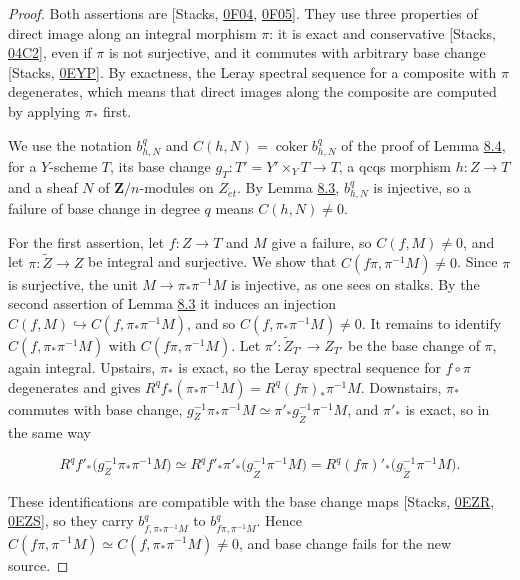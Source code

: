 \documentclass[11pt]{article}
\begin{document}
\begin{proof}[{Proof}]\label{bp660}%
Both assertions are [Stacks, \href{https://stacks.math.columbia.edu/tag/0F04}{0F04}, \href{https://stacks.math.columbia.edu/tag/0F05}{0F05}]. They use three properties of direct image along an integral morphism \(\pi\): it is exact and conservative [Stacks, \href{https://stacks.math.columbia.edu/tag/04C2}{04C2}], even if \(\pi\) is not surjective, and it commutes with arbitrary base change [Stacks, \href{https://stacks.math.columbia.edu/tag/0EYP}{0EYP}]. By exactness, the Leray spectral sequence for a composite with \(\pi\) degenerates, which means that direct images along the composite are computed by applying \(\pi_*\) first.

We use the notation \(b^q_{h,N}\) and \(C(h,N)=\operatorname{coker}b^q_{h,N}\) of the proof of Lemma \hyperref[bp656]{8.4}, for a \(Y\)-scheme \(T\), its base change \(g_T:T'=Y'\times_YT\to T\), a qcqs morphism \(h:Z\to T\) and a sheaf \(N\) of \(\mathbf Z/n\)-modules on \(Z_{\acute{e}t}\). By Lemma \hyperref[bp653]{8.3}, \(b^q_{h,N}\) is injective, so a failure of base change in degree \(q\) means \(C(h,N)\neq0\).

For the first assertion, let \(f:Z\to T\) and \(M\) give a failure, so \(C(f,M)\neq0\), and let \(\pi:\widetilde Z\to Z\) be integral and surjective. We show that \(C(f\pi,\pi^{-1}M)\neq0\). Since \(\pi\) is surjective, the unit \(M\to\pi_*\pi^{-1}M\) is injective, as one sees on stalks. By the second assertion of Lemma \hyperref[bp653]{8.3} it induces an injection \(C(f,M)\hookrightarrow C(f,\pi_*\pi^{-1}M)\), and so \(C(f,\pi_*\pi^{-1}M)\neq0\). It remains to identify \(C(f,\pi_*\pi^{-1}M)\) with \(C(f\pi,\pi^{-1}M)\). Let \(\pi':\widetilde Z_{T'}\to Z_{T'}\) be the base change of \(\pi\), again integral. Upstairs, \(\pi_*\) is exact, so the Leray spectral sequence for \(f\circ\pi\) degenerates and gives \(R^qf_*(\pi_*\pi^{-1}M)=R^q(f\pi)_*\pi^{-1}M\). Downstairs, \(\pi_*\) commutes with base change, \(g_Z^{-1}\pi_*\pi^{-1}M\simeq\pi'_*g_{\widetilde Z}^{-1}\pi^{-1}M\), and \(\pi'_*\) is exact, so in the same way

\[
R^qf'_*\bigl(g_Z^{-1}\pi_*\pi^{-1}M\bigr)
\simeq R^qf'_*\pi'_*\bigl(g_{\widetilde Z}^{-1}\pi^{-1}M\bigr)
=R^q(f\pi)'_*\bigl(g_{\widetilde Z}^{-1}\pi^{-1}M\bigr).
\]

These identifications are compatible with the base change maps [Stacks, \href{https://stacks.math.columbia.edu/tag/0EZR}{0EZR}, \href{https://stacks.math.columbia.edu/tag/0EZS}{0EZS}], so they carry \(b^q_{f,\pi_*\pi^{-1}M}\) to \(b^q_{f\pi,\pi^{-1}M}\). Hence \(C(f\pi,\pi^{-1}M)\simeq C(f,\pi_*\pi^{-1}M)\neq0\), and base change fails for the new source.


\end{proof}
\end{document}
